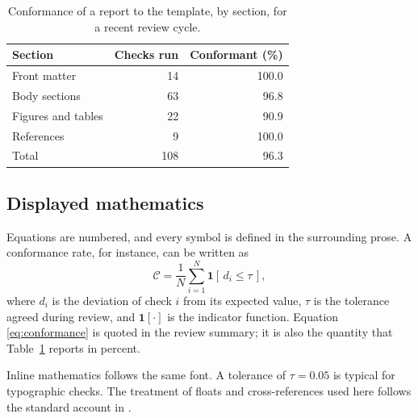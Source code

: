 \begin{table}[htbp]
  \centering
  \caption{Conformance of a report to the template, by section, for a recent review cycle.}
  \label{tab:conformance}
  \begin{tabular}{@{}lrr@{}}
    \toprule
    Section & Checks run & Conformant (\%) \\
    \midrule
    Front matter        & 14 & 100.0 \\
    Body sections       & 63 & 96.8 \\
    Figures and tables  & 22 & 90.9 \\
    References          &  9 & 100.0 \\
    \midrule
    Total               & 108 & 96.3 \\
    \bottomrule
  \end{tabular}
\end{table}

\subsection{Displayed mathematics}

Equations are numbered, and every symbol is defined in the surrounding prose. A conformance
rate, for instance, can be written as
\begin{equation}
  \label{eq:conformance}
  \mathcal{C} = \frac{1}{N}\sum_{i=1}^{N} \mathbf{1}\!\left[\, d_i \le \tau \,\right],
\end{equation}
where $d_i$ is the deviation of check $i$ from its expected value, $\tau$ is the tolerance
agreed during review, and $\mathbf{1}[\cdot]$ is the indicator function. Equation
\eqref{eq:conformance} is quoted in the review summary; it is also the quantity that
Table~\ref{tab:conformance} reports in percent.

Inline mathematics follows the same font. A tolerance of $\tau = 0.05$ is typical for
typographic checks. The treatment of floats and cross-references used here follows the
standard account in \citet{lamport1994}.
